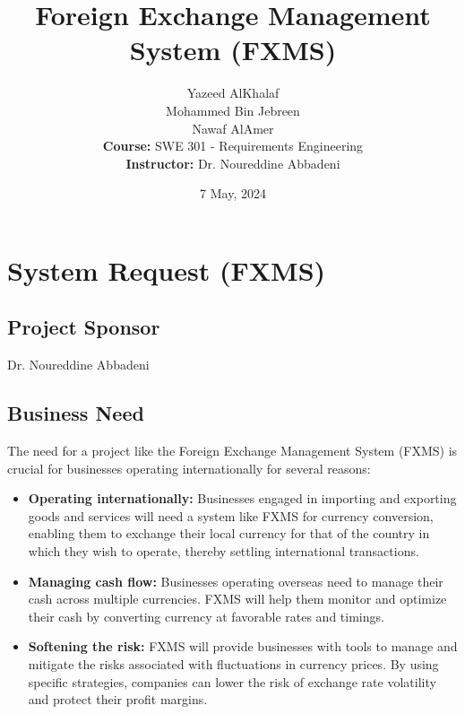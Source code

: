 \documentclass[a4paper]{report}
\title{Foreign Exchange Management System (FXMS)}
\author{
    Yazeed AlKhalaf \\
    Mohammed Bin Jebreen \\
    Nawaf AlAmer \\
    \textbf{Course:} SWE 301 - Requirements Engineering \\
    \textbf{Instructor:} Dr. Noureddine Abbadeni
}
\date{7 May, 2024}
\begin{document}
\maketitle

\newpage

\tableofcontents

\chapter{System Request (FXMS)}

\section{Project Sponsor}
Dr. Noureddine Abbadeni

\section{Business Need}
The need for a project like the Foreign Exchange Management System (FXMS) is crucial for businesses operating internationally for several reasons:
\begin{itemize}
    \item \textbf{Operating internationally:} Businesses engaged in importing and exporting goods and services will need a system like FXMS for currency conversion, enabling them to exchange their local currency for that of the country in which they wish to operate, thereby settling international transactions.
    \item \textbf{Managing cash flow:} Businesses operating overseas need to manage their cash across multiple currencies. FXMS will help them monitor and optimize their cash by converting currency at favorable rates and timings.
    \item \textbf{Softening the risk:} FXMS will provide businesses with tools to manage and mitigate the risks associated with fluctuations in currency prices. By using specific strategies, companies can lower the risk of exchange rate volatility and protect their profit margins.
\end{itemize}
\end{document}
